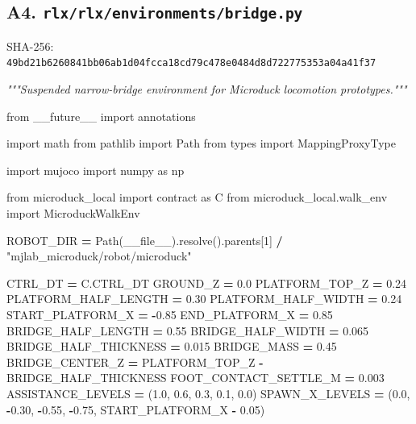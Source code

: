 \documentclass[
  american,
  11pt,
  letterpaper,
]{article}
\newenvironment{Shaded}{\begin{snugshade}}{\end{snugshade}}
\newcommand{\CommentTok}[1]{\textcolor[rgb]{0.56,0.35,0.01}{\textit{#1}}}
\newcommand{\DecValTok}[1]{\textcolor[rgb]{0.00,0.00,0.81}{#1}}
\newcommand{\FloatTok}[1]{\textcolor[rgb]{0.00,0.00,0.81}{#1}}
\newcommand{\ImportTok}[1]{#1}
\newcommand{\NormalTok}[1]{#1}
\newcommand{\OperatorTok}[1]{\textcolor[rgb]{0.81,0.36,0.00}{\textbf{#1}}}
\newcommand{\StringTok}[1]{\textcolor[rgb]{0.31,0.60,0.02}{#1}}
\newcommand{\VariableTok}[1]{\textcolor[rgb]{0.00,0.00,0.00}{#1}}
\renewenvironment{Shaded}{\par\smallskip}{\par\smallskip}
\begin{document}
\subsection{\texorpdfstring{A4.
\texttt{rlx/\allowbreak{}rlx/\allowbreak{}environm\allowbreak{}ents/\allowbreak{}bridge.p\allowbreak{}y}}{A4. }}\label{a4.-rlxrlxenvironmentsbridge.py}

SHA-256:
\texttt{49bd21b6\allowbreak{}260841bb\allowbreak{}06ab1d04\allowbreak{}fcca18cd\allowbreak{}79c478e0\allowbreak{}484d8d72\allowbreak{}2775353a\allowbreak{}04a41f37\allowbreak{}}

\begin{Shaded}
\begin{Highlighting}[]
\CommentTok{"""Suspended narrow{-}bridge environment for Microduck locomotion prototypes."""}

\ImportTok{from}\NormalTok{ \_\_future\_\_ }\ImportTok{import}\NormalTok{ annotations}

\ImportTok{import}\NormalTok{ math}
\ImportTok{from}\NormalTok{ pathlib }\ImportTok{import}\NormalTok{ Path}
\ImportTok{from}\NormalTok{ types }\ImportTok{import}\NormalTok{ MappingProxyType}

\ImportTok{import}\NormalTok{ mujoco}
\ImportTok{import}\NormalTok{ numpy }\ImportTok{as}\NormalTok{ np}

\ImportTok{from}\NormalTok{ microduck\_local }\ImportTok{import}\NormalTok{ contract }\ImportTok{as}\NormalTok{ C}
\ImportTok{from}\NormalTok{ microduck\_local.walk\_env }\ImportTok{import}\NormalTok{ MicroduckWalkEnv}

\NormalTok{ROBOT\_DIR }\OperatorTok{=}\NormalTok{ Path(}\VariableTok{\_\_file\_\_}\NormalTok{).resolve().parents[}\DecValTok{1}\NormalTok{] }\OperatorTok{/} \StringTok{"mjlab\_microduck/robot/microduck"}

\NormalTok{CTRL\_DT }\OperatorTok{=}\NormalTok{ C.CTRL\_DT}
\NormalTok{GROUND\_Z }\OperatorTok{=} \FloatTok{0.0}
\NormalTok{PLATFORM\_TOP\_Z }\OperatorTok{=} \FloatTok{0.24}
\NormalTok{PLATFORM\_HALF\_LENGTH }\OperatorTok{=} \FloatTok{0.30}
\NormalTok{PLATFORM\_HALF\_WIDTH }\OperatorTok{=} \FloatTok{0.24}
\NormalTok{START\_PLATFORM\_X }\OperatorTok{=} \OperatorTok{{-}}\FloatTok{0.85}
\NormalTok{END\_PLATFORM\_X }\OperatorTok{=} \FloatTok{0.85}
\NormalTok{BRIDGE\_HALF\_LENGTH }\OperatorTok{=} \FloatTok{0.55}
\NormalTok{BRIDGE\_HALF\_WIDTH }\OperatorTok{=} \FloatTok{0.065}
\NormalTok{BRIDGE\_HALF\_THICKNESS }\OperatorTok{=} \FloatTok{0.015}
\NormalTok{BRIDGE\_MASS }\OperatorTok{=} \FloatTok{0.45}
\NormalTok{BRIDGE\_CENTER\_Z }\OperatorTok{=}\NormalTok{ PLATFORM\_TOP\_Z }\OperatorTok{{-}}\NormalTok{ BRIDGE\_HALF\_THICKNESS}
\NormalTok{FOOT\_CONTACT\_SETTLE\_M }\OperatorTok{=} \FloatTok{0.003}
\NormalTok{ASSISTANCE\_LEVELS }\OperatorTok{=}\NormalTok{ (}\FloatTok{1.0}\NormalTok{, }\FloatTok{0.6}\NormalTok{, }\FloatTok{0.3}\NormalTok{, }\FloatTok{0.1}\NormalTok{, }\FloatTok{0.0}\NormalTok{)}
\NormalTok{SPAWN\_X\_LEVELS }\OperatorTok{=}\NormalTok{ (}\FloatTok{0.0}\NormalTok{, }\OperatorTok{{-}}\FloatTok{0.30}\NormalTok{, }\OperatorTok{{-}}\FloatTok{0.55}\NormalTok{, }\OperatorTok{{-}}\FloatTok{0.75}\NormalTok{, START\_PLATFORM\_X }\OperatorTok{{-}} \FloatTok{0.05}\NormalTok{)}


\end{Highlighting}
\end{Shaded}
\end{document}
